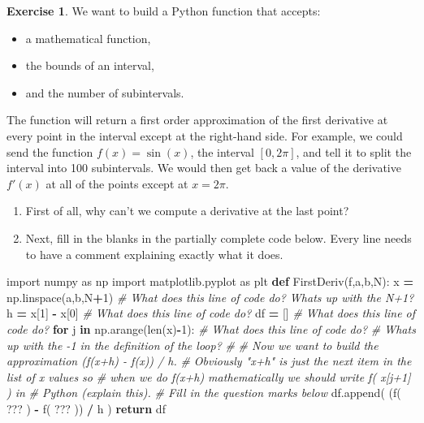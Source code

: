 \documentclass[
]{book}
\newenvironment{Shaded}{\begin{snugshade}}{\end{snugshade}}
\newcommand{\BuiltInTok}[1]{#1}
\newcommand{\CommentTok}[1]{\textcolor[rgb]{0.56,0.35,0.01}{\textit{#1}}}
\newcommand{\ControlFlowTok}[1]{\textcolor[rgb]{0.13,0.29,0.53}{\textbf{#1}}}
\newcommand{\DecValTok}[1]{\textcolor[rgb]{0.00,0.00,0.81}{#1}}
\newcommand{\ImportTok}[1]{#1}
\newcommand{\KeywordTok}[1]{\textcolor[rgb]{0.13,0.29,0.53}{\textbf{#1}}}
\newcommand{\NormalTok}[1]{#1}
\newcommand{\OperatorTok}[1]{\textcolor[rgb]{0.81,0.36,0.00}{\textbf{#1}}}
\providecommand{\tightlist}{%
  \setlength{\itemsep}{0pt}\setlength{\parskip}{0pt}}
\theoremstyle{definition}
\theoremstyle{definition}
\theoremstyle{definition}
\newtheorem{exercise}{Exercise}[chapter]
\theoremstyle{remark}
\begin{document}
\begin{exercise}
\protect\hypertarget{exr:unnamed-chunk-151}{}{\label{exr:unnamed-chunk-151} }We want to build a Python function that accepts:

\begin{itemize}
\tightlist
\item
  a mathematical function,
\item
  the bounds of an interval,
\item
  and the number of subintervals.
\end{itemize}

The function will return a first order approximation of the first derivative at every point in the interval except at the right-hand side. For example, we could send the function \(f(x) = \sin(x)\), the interval \([0,2\pi]\), and tell it to split the interval into 100 subintervals. We would then get back a value of the derivative \(f'(x)\) at all of the points except at \(x=2\pi\).

\begin{enumerate}
\def\labelenumi{\alph{enumi}.}
\tightlist
\item
  First of all, why can't we compute a derivative at the last point?
\item
  Next, fill in the blanks in the partially complete code below. Every line needs to have a comment explaining exactly what it does.
\end{enumerate}
\end{exercise}

\begin{Shaded}
\begin{Highlighting}[]
\ImportTok{import}\NormalTok{ numpy }\ImportTok{as}\NormalTok{ np}
\ImportTok{import}\NormalTok{ matplotlib.pyplot }\ImportTok{as}\NormalTok{ plt}
\KeywordTok{def}\NormalTok{ FirstDeriv(f,a,b,N):}
\NormalTok{    x }\OperatorTok{=}\NormalTok{ np.linspace(a,b,N}\OperatorTok{+}\DecValTok{1}\NormalTok{) }\CommentTok{\# What does this line of code do? What\textquotesingle{}s up with the N+1?}
\NormalTok{    h }\OperatorTok{=}\NormalTok{ x[}\DecValTok{1}\NormalTok{] }\OperatorTok{{-}}\NormalTok{ x[}\DecValTok{0}\NormalTok{] }\CommentTok{\# What does this line of code do?}
\NormalTok{    df }\OperatorTok{=}\NormalTok{ [] }\CommentTok{\# What does this line of code do?}
    \ControlFlowTok{for}\NormalTok{ j }\KeywordTok{in}\NormalTok{ np.arange(}\BuiltInTok{len}\NormalTok{(x)}\OperatorTok{{-}}\DecValTok{1}\NormalTok{): }\CommentTok{\# What does this line of code do?  }
        \CommentTok{\# What\textquotesingle{}s up with the {-}1 in the definition of the loop?}
        \CommentTok{\# }
        \CommentTok{\# Now we want to build the approximation (f(x+h) {-} f(x)) / h.}
        \CommentTok{\# Obviously "x+h" is just the next item in the list of x values so }
        \CommentTok{\# when we do f(x+h) mathematically we should write f( x[j+1] ) in }
        \CommentTok{\# Python (explain this).  }
        \CommentTok{\# Fill in the question marks below}
\NormalTok{        df.append( (f( ??? ) }\OperatorTok{{-}}\NormalTok{ f( ??? )) }\OperatorTok{/}\NormalTok{ h )}
    \ControlFlowTok{return}\NormalTok{ df}
\end{Highlighting}
\end{Shaded}
\end{document}
